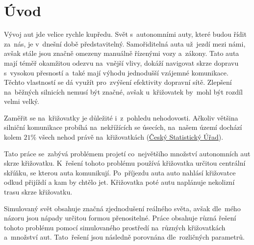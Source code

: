 \chapter*{Úvod}\label{ch:uvod}

Vývoj aut jde velice rychle kupředu.
Svět s~autonomními auty, které budou řídit za~nás, je v~dnešní době představitelný.
Samořiditelná auta už~jezdí mezi námi, avšak stále jsou značně omezeny manuálně řízenými vozy a~zákony.
Tato auta mají téměř okamžitou odezvu na~vnější vlivy, dokáží navigovat skrze dopravu s~vysokou přesností a~také mají výhodu jednodušší vzájemné komunikace.
Těchto vlastností se dá využít pro~zvýšení efektivity dopravní sítě.
Zlepšení na~běžných silnicích nemusí být značné, avšak u~křižovatek by~mohl být rozdíl velmi velký.

Zaměřit se na~křižovatky je důležité i~z~pohledu nehodovosti.
Ačkoliv většina silniční komunikace probíhá na~nekřížících se úsecích, na~našem území dochází kolem $21\%$ všech nehod
právě na~křižovatkách (\href{https://www.czso.cz/documents/10180/20534694/32025414a06.pdf}{Český Statistický Úřad}).

Tato práce se~zabývá problémem projetí co~největšího množství autonomních aut skrze křižovatku.
K~řešení tohoto problému používá křižovatka určitou centrální skříňku, se kterou auta komunikují.
Po~příjezdu auta auto nahlásí křižovatce odkud přijíždí a kam by chtělo jet.
Křižovatka poté autu naplánuje nekolizní trasu skrze křižovatku.

Simulovaný svět obsahuje značná zjednodušení reálného světa, avšak dle~mého názoru jsou nápady určitou formou přenositelné.
Práce obsahuje různá řešení tohoto problému pomocí simulovaného prostředí na~různých křižovatkách a~množství aut.
Tato~řešení jsou následně porovnána dle~rozličných parametrů.







